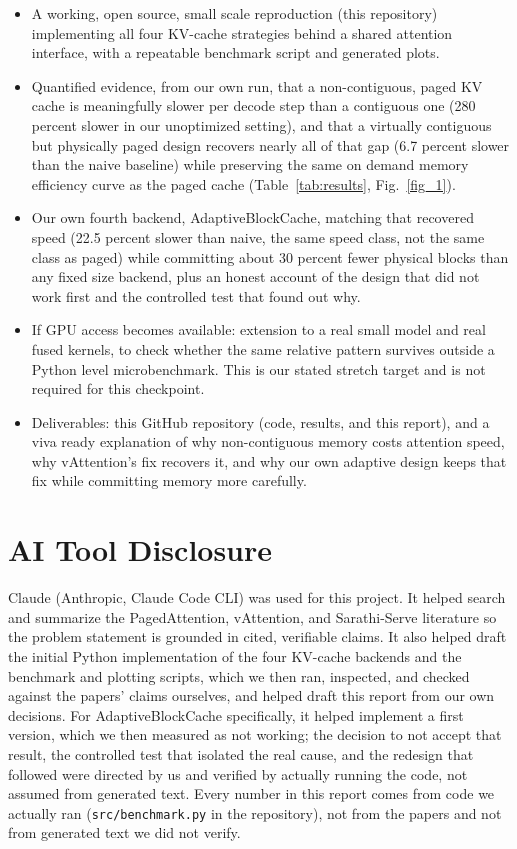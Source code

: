 \documentclass[lettersize,journal]{IEEEtran}
\begin{document}
\begin{itemize}
    \item A working, open source, small scale reproduction (this repository) implementing all four KV-cache strategies behind a shared attention interface, with a repeatable benchmark script and generated plots.
    \item Quantified evidence, from our own run, that a non-contiguous, paged KV cache is meaningfully slower per decode step than a contiguous one (280 percent slower in our unoptimized setting), and that a virtually contiguous but physically paged design recovers nearly all of that gap (6.7 percent slower than the naive baseline) while preserving the same on demand memory efficiency curve as the paged cache (Table~\ref{tab:results}, Fig.~\ref{fig_1}).
    \item Our own fourth backend, AdaptiveBlockCache, matching that recovered speed (22.5 percent slower than naive, the same speed class, not the same class as paged) while committing about 30 percent fewer physical blocks than any fixed size backend, plus an honest account of the design that did not work first and the controlled test that found out why.
    \item If GPU access becomes available: extension to a real small model and real fused kernels, to check whether the same relative pattern survives outside a Python level microbenchmark. This is our stated stretch target and is not required for this checkpoint.
    \item Deliverables: this GitHub repository (code, results, and this report), and a viva ready explanation of why non-contiguous memory costs attention speed, why vAttention's fix recovers it, and why our own adaptive design keeps that fix while committing memory more carefully.
\end{itemize}

\nocite{kwon2023efficient}
\nocite{prabhu2024vattention}
\nocite{agrawal2024sarathi}
\nocite{vaswani2017attention}




\appendices
\section*{AI Tool Disclosure}
Claude (Anthropic, Claude Code CLI) was used for this project. It helped search and summarize the PagedAttention, vAttention, and Sarathi-Serve literature so the problem statement is grounded in cited, verifiable claims. It also helped draft the initial Python implementation of the four KV-cache backends and the benchmark and plotting scripts, which we then ran, inspected, and checked against the papers' claims ourselves, and helped draft this report from our own decisions. For AdaptiveBlockCache specifically, it helped implement a first version, which we then measured as not working; the decision to not accept that result, the controlled test that isolated the real cause, and the redesign that followed were directed by us and verified by actually running the code, not assumed from generated text. Every number in this report comes from code we actually ran (\texttt{src/benchmark.py} in the repository), not from the papers and not from generated text we did not verify.
\end{document}
